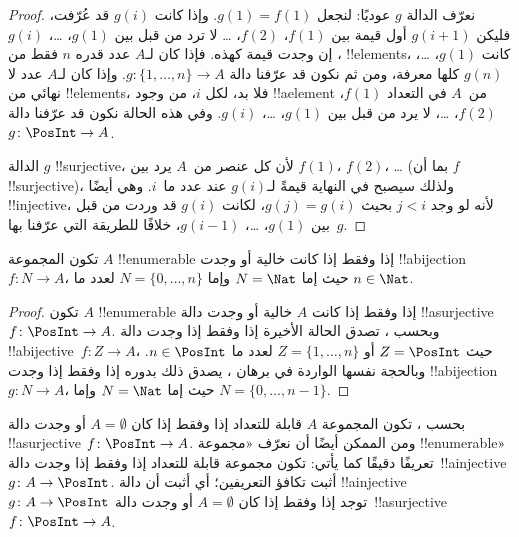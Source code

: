 \documentclass[../../../include/open-logic-section]{subfiles}
\begin{document}
\begin{proof}
  نعرّف الدالة $g$ عوديًا: لنجعل $g(1) = f(1)$. وإذا كانت $g(i)$
  قد عُرّفت، فليكن $g(i+1)$ أول قيمة بين $f(1)$، $f(2)$، \dots{}
  لا ترد من قبل بين $g(1)$، \dots، $g(i)$، إن وجدت قيمة كهذه. فإذا
  كان لـ$A$ عدد قدره $n$ فقط من !!{element}s، كانت $g(1)$، \dots،
  $g(n)$ كلها معرفة، ومن ثم نكون قد عرّفنا دالة $g\colon \{1, \dots, n\}
  \to A$. وإذا كان لـ$A$ عدد لا نهائي من !!{element}s، فلا بد، لكل
  $i$، من وجود !!a{element} من~$A$ في التعداد $f(1)$، $f(2)$،
  \dots، لا يرد من قبل بين $g(1)$، \dots، $g(i)$. وفي هذه الحالة
  نكون قد عرّفنا دالة $g\colon \PosInt \to A$.

  الدالة $g$ !!{surjective}، لأن كل عنصر من~$A$ يرد بين $f(1)$،
  $f(2)$، \dots{} (بما أن $f$ !!{surjective})، ولذلك سيصبح في
  النهاية قيمةً لـ$g(i)$ عند عدد ما~$i$. وهي أيضًا !!{injective}،
  لأنه لو وجد $j < i$ بحيث $g(j) = g(i)$، لكانت $g(i)$ قد وردت
  من قبل بين $g(1)$، \dots، $g(i-1)$، خلافًا للطريقة التي عرّفنا
  بها~$g$.
\end{proof}

\begin{cor}
تكون المجموعة $A$ !!{enumerable} إذا وفقط إذا كانت خالية أو وجدت
!!a{bijection} $f\colon N \to A$، حيث إما $N = \Nat$ وإما
$N = \{0, \dots, n\}$ لعدد ما $n \in \Nat$.
\end{cor}

\begin{proof}
تكون $A$ !!{enumerable} إذا وفقط إذا كانت $A$ خالية أو وجدت دالة
!!a{surjective} $f\colon \PosInt \to A$. وبحسب
، تصدق الحالة الأخيرة إذا وفقط إذا وجدت دالة
!!a{bijective}~$f\colon Z \to A$، حيث $Z =
\PosInt$ أو
$Z = \{1, \dots, n\}$ لعدد ما $n \in \PosInt$. وبالحجة نفسها
الواردة في برهان ، يصدق ذلك بدوره إذا وفقط إذا
وجدت !!a{bijection} $g\colon N \to A$، حيث إما $N = \Nat$ وإما
$N = \{0, \dots, n-1\}$.
\end{proof}

\begin{prob}
  بحسب ، تكون المجموعة $A$
  قابلة للتعداد إذا وفقط إذا كان $A = \emptyset$ أو وجدت دالة
  !!a{surjective} $f\colon
  \PosInt \to A$. ومن الممكن أيضًا أن
  نعرّف «مجموعة !!{enumerable}» تعريفًا دقيقًا كما يأتي: تكون مجموعة
  قابلة للتعداد إذا وفقط إذا وجدت دالة~!!a{injective}
  $g\colon A \to \PosInt$. أثبت تكافؤ التعريفين؛ أي أثبت أن دالة
  !!a{injective} $g\colon A \to \PosInt$ توجد إذا وفقط إذا كان
  $A = \emptyset$ أو وجدت دالة~!!a{surjective} $f\colon \PosInt \to A$.
\end{prob}
\end{document}

